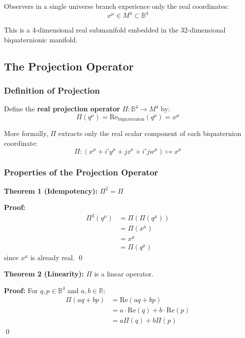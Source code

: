 Observers in a single universe branch experience only the real coordinates:
\begin{equation}
x^{\mu} \in M^4 \subset \mathbb{B}^4
\end{equation}

This is a 4-dimensional real submanifold embedded in the 32-dimensional biquaternionic manifold.

\subsection{The Projection Operator}

\subsubsection{Definition of Projection}

Define the \textbf{real projection operator} $\Pi: \mathbb{B}^4 \to M^4$ by:
\begin{equation}
\Pi(q^{\mu}) = \text{Re}_{\text{biquaternion}}(q^{\mu}) = x^{\mu}
\label{eq:projection_operator}
\end{equation}

More formally, $\Pi$ extracts only the real scalar component of each biquaternion coordinate:
\begin{equation}
\Pi: (x^{\mu} + i' y^{\mu} + j z^{\mu} + i'j w^{\mu}) \mapsto x^{\mu}
\end{equation}

\subsubsection{Properties of the Projection Operator}

\textbf{Theorem 1 (Idempotency):} $\Pi^2 = \Pi$

\textbf{Proof:} 
\begin{align}
\Pi^2(q^{\mu}) &= \Pi(\Pi(q^{\mu})) \\
&= \Pi(x^{\mu}) \\
&= x^{\mu} \\
&= \Pi(q^{\mu})
\end{align}
since $x^{\mu}$ is already real. \qed

\textbf{Theorem 2 (Linearity):} $\Pi$ is a linear operator.

\textbf{Proof:} For $q, p \in \mathbb{B}^4$ and $a, b \in \mathbb{R}$:
\begin{align}
\Pi(aq + bp) &= \text{Re}(aq + bp) \\
&= a \cdot \text{Re}(q) + b \cdot \text{Re}(p) \\
&= a \Pi(q) + b \Pi(p)
\end{align}
\qed

